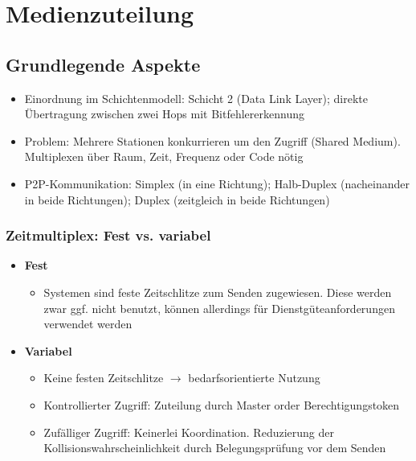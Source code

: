 \section{Medienzuteilung}

\subsection{Grundlegende Aspekte}
\begin{itemize}
	\item Einordnung im Schichtenmodell: Schicht 2 (Data Link Layer); direkte Übertragung zwischen zwei Hops mit Bitfehlererkennung
	\item Problem: Mehrere Stationen konkurrieren um den Zugriff (Shared Medium). Multiplexen über Raum, Zeit, Frequenz oder Code nötig
	\item P2P-Kommunikation: Simplex (in eine Richtung); Halb-Duplex (nacheinander in beide Richtungen); Duplex (zeitgleich in beide Richtungen)
\end{itemize}

\subsubsection{Zeitmultiplex: Fest vs. variabel}
\begin{itemize}
	\item \textbf{Fest}
	\begin{itemize}
		\item Systemen sind feste Zeitschlitze zum Senden zugewiesen. Diese werden zwar ggf. nicht benutzt, können allerdings für Dienstgüteanforderungen verwendet werden
	\end{itemize}
	\item \textbf{Variabel}
	\begin{itemize}
		\item Keine festen Zeitschlitze \(\rightarrow\) bedarfsorientierte Nutzung
		\item Kontrollierter Zugriff: Zuteilung durch Master order Berechtigungstoken
		\item Zufälliger Zugriff: Keinerlei Koordination. Reduzierung der Kollisionswahrscheinlichkeit durch Belegungsprüfung vor dem Senden
	\end{itemize}
\end{itemize}

